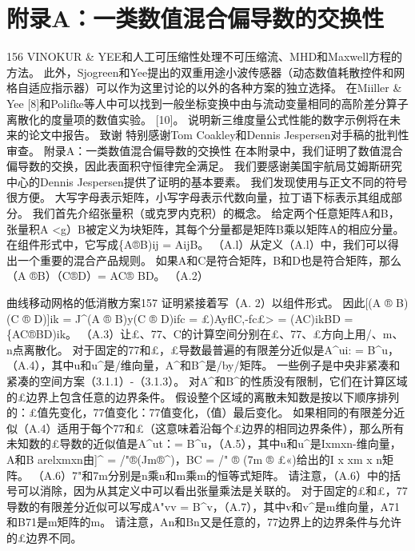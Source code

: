 \documentclass[UTF8,11pt,a4paper,openany,fontset=fandol]{ctexbook}
\begin{document}
\section{附录A：一类数值混合偏导数的交换性}
156 VINOKUR \& YEE和人工可压缩性处理不可压缩流、MHD和Maxwell方程的方法。 此外，Sjogreen和Yee提出的双重用途小波传感器（动态数值耗散控件和网格自适应指示器）可以作为这里讨论的以外的各种方案的独立选择。 在Miiller \& Yee [8]和Polifke等人中可以找到一般坐标变换中由与流动变量相同的高阶差分算子离散化的度量项的数值实验。 [10]。 说明新三维度量公式性能的数字示例将在未来的论文中报告。 致谢 特别感谢Tom Coakley和Dennis Jespersen对手稿的批判性审查。 附录A：一类数值混合偏导数的交换性 在本附录中，我们证明了数值混合偏导数的交换，因此表面积守恒律完全满足。 我们要感谢美国宇航局艾姆斯研究中心的Dennis Jespersen提供了证明的基本要素。 我们发现使用与正文不同的符号很方便。 大写字母表示矩阵，小写字母表示代数向量，拉丁语下标表示其组成部分。 我们首先介绍张量积（或克罗内克积）的概念。 给定两个任意矩阵A和B，张量积A <g）B被定义为块矩阵，其每个分量都是矩阵B乘以矩阵A的相应分量。 在组件形式中，它写成\{A®B)ij = AijB。 （A.l）从定义（A.l）中，我们可以得出一个重要的混合产品规则。 如果A和C是符合矩阵，B和D也是符合矩阵，那么（A ®B）（C®D）= AC® BD。 （A.2）

曲线移动网格的低消散方案157 证明紧接着写（A. 2）以组件形式。 因此[(A ® B)(C ® D)]ik = J\textasciicircum{}(A ® B)y(C ® D)ifc = £)AyflC,-fc£> = (AC)ikBD = \{AC®BD)ik。 （A.3）让£、77、C的计算空间分别在£、77、£方向上用/、m、n点离散化。 对于固定的77和£，£导数最普遍的有限差分近似是A\textasciicircum{}ui: = B\textasciicircum{}u，（A.4），其中u和u\textasciicircum{}是/维向量，A\textasciicircum{}和B\textasciicircum{}是/by/矩阵。 一些例子是中央非紧凑和紧凑的空间方案（3.1.1）-（3.1.3）。 对A\textasciicircum{}和B\textasciicircum{}的性质没有限制，它们在计算区域的£边界上包含任意的边界条件。 假设整个区域的离散未知数是按以下顺序排列的：£值先变化，77值变化：77值变化，（值）最后变化。 如果相同的有限差分近似（A.4）适用于每个77和£（这意味着沿每个£边界的相同边界条件），那么所有未知数的£导数的近似值是A\textasciicircum{}ut：= B\textasciicircum{}u，（A.5），其中u和u\textasciicircum{}是Ixmxn-维向量，A和B arelxmxn由]\textasciicircum{} = /"®(Jm®\textasciicircum{})，BC = /" ® (7m ® £«)给出的I x xm x n矩阵。 （A.6）7"和7m分别是n乘n和m乘m的恒等式矩阵。 请注意，（A.6）中的括号可以消除，因为从其定义中可以看出张量乘法是关联的。 对于固定的£和£，77导数的有限差分近似可以写成A"vv = B\textasciicircum{}v，（A.7），其中v和v\textasciicircum{}是m维向量，A71和B71是m矩阵的m。 请注意，An和Bn又是任意的，77边界上的边界条件与允许的£边界不同。
\end{document}

